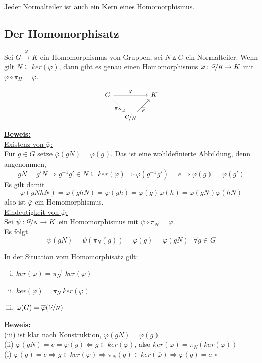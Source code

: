 \documentclass[a4paper, pagesize=pdftex, pdftex, twoside, headsepline, index=totoc,toc=listof, fontsize=10pt, cleardoublepage=empty, headinclude, DIV=13, BCOR=13mm]{scrartcl}
\newcommand{\bet}[1]{\uline{\textbf{#1}}} %
\begin{document}
Jeder Normalteiler ist auch ein Kern eines Homomorphismus.

\subsection{Der Homomorphisatz}
\label{sub:der_homomorphisatz}
Sei $G \stackrel{\varphi}{\to} K$ ein Homomorphismus von Gruppen, sei $N \vartriangle G$ ein Normalteiler. Wenn gilt $N\subseteq ker(\varphi)$, dann gibt es \uline{genau einen} Homomorphismus $\overline{\varphi}: \nicefrac{G}{H} \to K$ mit $\overline{\varphi} \circ \pi_H=\varphi$.

\[
\begin{tikzcd}[column sep=small]
	G \ar{rr}{\varphi} \ar{rd}[below]{\pi_N} & & K\\
	& \nicefrac{G}{N} \ar{ru}[below]{\overline{\varphi}} &
\end{tikzcd}
\]
\newpage
\bet{Beweis:}\\
\uline{Existenz von $\overline{\varphi}$:}\\
Für $g \in G$ setze $\overline{\varphi}(gN)=\varphi(g)$. Das ist eine wohldefinierte Abbildung, denn angenommen, 
\[gN=g'N \Rightarrow g^{-1}g' \in N \subseteq ker(\varphi) \Rightarrow \varphi(g^{-1}g')=e \Rightarrow \varphi(g)=\varphi(g')\]
Es gilt damit
\[\overline{\varphi}(gNhN)=\overline{\varphi}(ghN)=\varphi(gh)=\varphi(g)\varphi(h)=\overline{\varphi}(gN)\overline{\varphi}(hN) \]
also ist $\overline{\varphi}$ ein Homomorphismus.\\

\uline{Eindeutigkeit von $\overline{\varphi}$:}\\ Sei $\psi: \nicefrac{G}{N} \to K$ ein Homomorphismus mit $\psi \circ \pi_N = \varphi$.\\
Es folgt 
\[
\psi(gN)=\psi(\pi_N(g))=\varphi(g)=\overline{\varphi}(gN) ~~~\forall g \in G
\]

In der Situation vom Homomorphisatz gilt:
\begin{enumerate}[(i)]
	\item $ker(\varphi)=\pi_N^{-1}~ker(\overline{\varphi})$
	\item $ker(\overline{\varphi})=\pi_N~ker(\varphi)$
	\item $\varphi(G)=\overline{\varphi}(\nicefrac{G}{N})$
\end{enumerate}
\bet{Beweis:}\\
(iii) ist klar nach Konstruktion, $\overline{\varphi}(gN)=\varphi(g)$\\
(ii) $\overline{\varphi}(gN)=e=\varphi(g) \Leftrightarrow g \in ker(\varphi)$, also $ker(\overline{\varphi})=\pi_N(ker(\varphi))$\\
(i) $\varphi(g)=e \Rightarrow g \in ker(\varphi) \Rightarrow\pi_N(g) \in ker(\overline{\varphi}) \Rightarrow \varphi(g)=e$
\hfill $\square$






















\cleardoubleoddemptypage
{}
\setcounter{page}{1}
\printindex
\listoffigures
\end{document}
